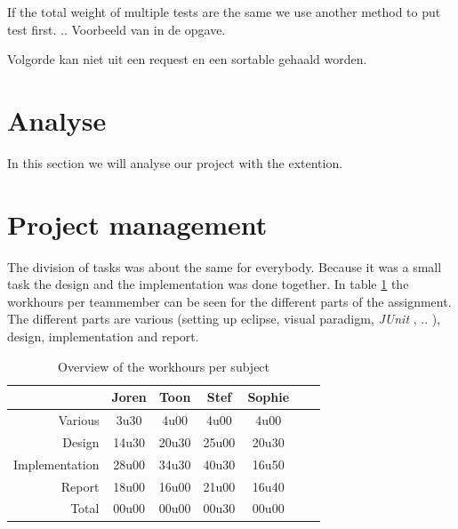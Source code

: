\documentclass[i2]{oss}
\newcommand{\junit}{\emph{JUnit }}
\begin{document}
If the total weight of multiple tests are the same we use another method to put test first. .. Voorbeeld van in de opgave.

Volgorde kan niet uit een request en een sortable gehaald worden. 


\section{Analyse}
In this section we will analyse our project with the extention. 

\section{Project management}
\label{ssec:Projectmanag}

The division of tasks was about the same for everybody. Because it was a small task the design and the implementation was done together. In table \ref{tab:werkuren} the workhours per teammember can be seen for the different parts of the assignment. The different parts are various (setting up eclipse, visual paradigm, \junit, .. ), design, implementation and report. 





\begin{table}[h!]
\begin{center}
    \begin{tabular}{ r | c  c  c  c  c  c}
     & Joren & Toon & Stef & Sophie \\ \hline
    	Various & 		3u30 & 4u00 & 4u00 & 4u00\\
        Design & 		14u30 & 20u30 & 25u00 & 20u30 \\
        Implementation & 28u00 & 34u30 & 40u30 & 16u50\\
        Report & 		18u00 & 16u00 & 21u00 & 16u40 \\
        Total & 		00u00 & 00u00 & 00u30 & 00u00  
    \end{tabular}
    \caption{Overview of the workhours per subject}
    \label{tab:werkuren}
\end{center}
\end{table}
\end{document}
